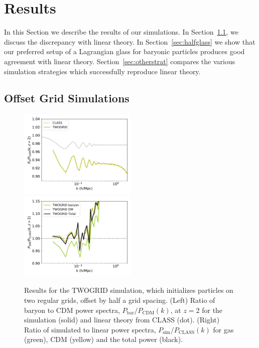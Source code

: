 \documentclass[a4paper,11pt]{article}
\begin{document}
\section{Results}
\label{sec:results}

In this Section we describe the results of our simulations. In Section~\ref{sec:offsetgrid}, we discuss the discrepancy with linear theory. In Section~\ref{sec:halfglass} we show that our preferred setup of a Lagrangian glass for baryonic particles produces good agreement with linear theory. Section~\ref{sec:otherstrat} compares the various simulation strategies which successfully reproduce linear theory.

\subsection{Offset Grid Simulations}
\label{sec:offsetgrid}

\begin{figure}
  \includegraphics[width=0.5\textwidth]{plots/literature_2_relpower.pdf}
\includegraphics[width=0.5\textwidth]{plots/literature_2_class.pdf}
\caption{Results for the TWOGRID simulation, which initializes particles on two regular grids, offset by half a grid spacing. (Left) Ratio of baryon to CDM power spectra, $P_\mathrm{bar}/P_\mathrm{CDM}(k)$, at $z=2$ for the simulation (solid) and linear theory from CLASS (dot). (Right) Ratio of simulated to linear power spectra, $P_\mathrm{sim}/P_\mathrm{CLASS}(k)$ for gas (green), CDM (yellow) and the total power (black).}
  \label{fig:offsetgrids}
\end{figure}
\end{document}
